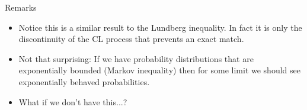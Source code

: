 \documentclass[11pt]{beamer}
\begin{document}
\begin{frame}{Remarks}

\begin{itemize}

\item Notice this is a similar result to the Lundberg inequality. In fact it is only the discontinuity of the CL process that prevents an exact match. 

\vfill

\item Not that surprising: If we have probability distributions that are exponentially bounded (Markov inequality) then for some limit we should see exponentially behaved probabilities. 

\vfill

\item What if we don't have this...?

\end{itemize}

\end{frame}
\end{document}
